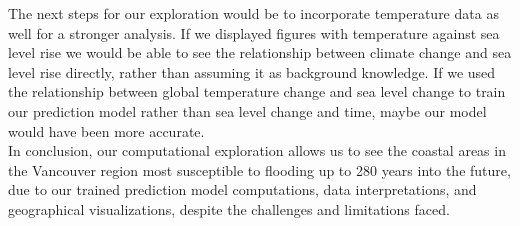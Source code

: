 \documentclass[fontsize=11pt]{article}
\begin{document}
The next steps for our exploration would be to incorporate temperature data as well for a stronger analysis. If we displayed figures with temperature against sea level rise we would be able to see the relationship between climate change and sea level rise directly, rather than assuming it as background knowledge. If we used the relationship between global temperature change and sea level change to train our prediction model rather than sea level change and time, maybe our model would have been more accurate. \\

In conclusion, our computational exploration allows us to see the coastal areas in the Vancouver region most susceptible to flooding up to 280 years into the future, due to our trained prediction model computations, data interpretations, and geographical visualizations, despite the challenges and limitations faced. 

 
\end{document}
